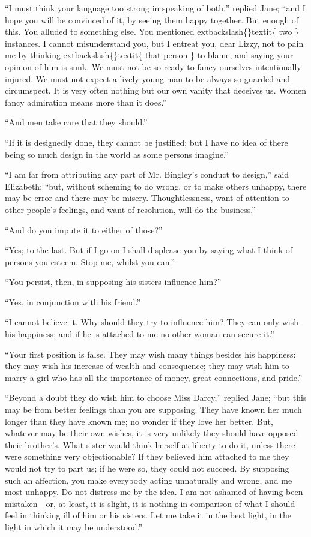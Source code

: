 \documentclass[10pt]{book}
\begin{document}
   “I must think your language too strong in speaking of both,” replied
Jane; “and I hope you will be convinced of it, by seeing them happy
together. But enough of this. You alluded to something else. You
mentioned
   	extbackslash\{\}textit\{
    two
   \}
   instances. I cannot misunderstand you, but I entreat
you, dear Lizzy, not to pain me by thinking
   	extbackslash\{\}textit\{
    that person
   \}
   to blame, and
saying your opinion of him is sunk. We must not be so ready to fancy
ourselves intentionally injured. We must not expect a lively young man
to be always so guarded and circumspect. It is very often nothing but
our own vanity that deceives us. Women fancy admiration means more than
it does.”
  

   “And men take care that they should.”
  

   “If it is designedly done, they cannot be justified; but I have no idea
of there being so much design in the world as some persons imagine.”
  

   “I am far from attributing any part of Mr. Bingley’s conduct to design,”
said Elizabeth; “but, without scheming to do wrong, or to make others
unhappy, there may be error and there may be misery. Thoughtlessness,
want of attention to other people’s feelings, and want of resolution,
will do the business.”
  

   “And do you impute it to either of those?”
  

   “Yes; to the last. But if I go on I shall displease you by saying what I
think of persons you esteem. Stop me, whilst you can.”
  

   “You persist, then, in supposing his sisters influence him?”
  

   “Yes, in conjunction with his friend.”
  

   “I cannot believe it. Why should they try to influence him? They can
only wish his happiness; and if he is attached to me no other woman can
secure it.”
  

   “Your first position is false. They may wish many things besides his
happiness: they may wish his increase of wealth and consequence; they
may wish him to marry a girl who has all the importance of money, great
connections, and pride.”
  

   “Beyond a doubt they do wish him to choose Miss Darcy,” replied Jane;
“but this may be from better
   feelings than you are supposing. They have
known her much longer than they have known me; no wonder if they love
her better. But, whatever may be their own wishes, it is very unlikely
they should have opposed their brother’s. What sister would think
herself at liberty to do it, unless there were something very
objectionable? If they believed him attached to me they would not try to
part us; if he were so, they could not succeed. By supposing such an
affection, you make everybody acting unnaturally and wrong, and me most
unhappy. Do not distress me by the idea. I am not ashamed of having been
mistaken—or, at least, it is slight, it is nothing in comparison of
what I should feel in thinking ill of him or his sisters. Let me take it
in the best light, in the light in which it may be understood.”
  
\end{document}
